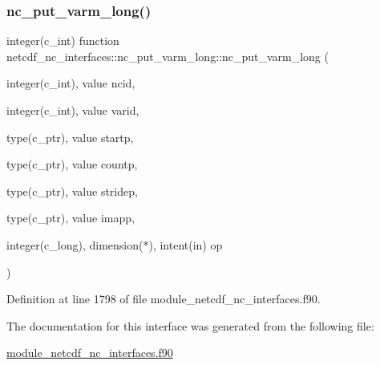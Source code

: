 \subsubsection{\texorpdfstring{nc\+\_\+put\+\_\+varm\+\_\+long()}{nc\_put\_varm\_long()}}
{\footnotesize\ttfamily integer(c\+\_\+int) function netcdf\+\_\+nc\+\_\+interfaces\+::nc\+\_\+put\+\_\+varm\+\_\+long\+::nc\+\_\+put\+\_\+varm\+\_\+long (\begin{DoxyParamCaption}\item[{integer(c\+\_\+int), value}]{ncid,  }\item[{integer(c\+\_\+int), value}]{varid,  }\item[{type(c\+\_\+ptr), value}]{startp,  }\item[{type(c\+\_\+ptr), value}]{countp,  }\item[{type(c\+\_\+ptr), value}]{stridep,  }\item[{type(c\+\_\+ptr), value}]{imapp,  }\item[{integer(c\+\_\+long), dimension($\ast$), intent(in)}]{op }\end{DoxyParamCaption})}



Definition at line 1798 of file module\+\_\+netcdf\+\_\+nc\+\_\+interfaces.\+f90.



The documentation for this interface was generated from the following file\+:\begin{DoxyCompactItemize}
\item 
\hyperlink{module__netcdf__nc__interfaces_8f90}{module\+\_\+netcdf\+\_\+nc\+\_\+interfaces.\+f90}\end{DoxyCompactItemize}
